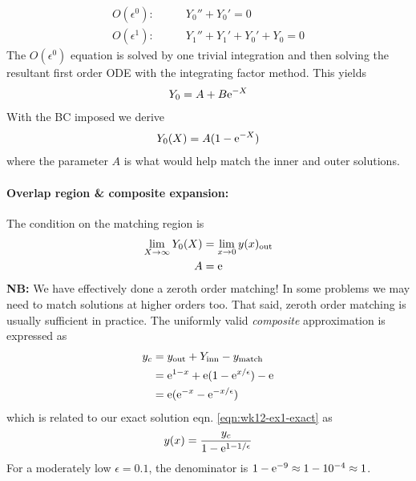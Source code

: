 \begin{align*}
	O(\epsilon^0): \qquad & Y_0'' + Y_0' = 0 \\
	O(\epsilon^1): \qquad & Y_1'' + Y_1' + Y_0' + Y_0 = 0
\end{align*}
The $O(\epsilon^0)$ equation is solved by one trivial integration and then solving the resultant first order ODE with the integrating factor method. This yields
\begin{gather*}
	Y_0 = A + B\mathrm{e}^{-X}
\end{gather*}
With the BC imposed we derive
\begin{gather*}
	Y_0(X) = A (1 - \mathrm{e}^{-X})
\end{gather*}
where the parameter $A$ is what would help match the inner and outer solutions.

\paragraph{Overlap region \& composite expansion:} The condition on the matching region is
\begin{align*}
	\lim\limits_{X \rightarrow \infty} Y_0(X) &= \lim\limits_{x\rightarrow 0} y(x)_\mathrm{out} \\
	A &= \mathrm{e}
\end{align*}
{\bf NB:} We have effectively done a zeroth order matching! In some problems we may need to match solutions at higher orders too. That said, zeroth order matching is usually sufficient in practice. The uniformly valid \emph{composite} approximation is expressed as
\begin{align*}
	y_c &= y_\mathrm{out} + Y_\mathrm{inn} - y_\mathrm{match} \\
	&= \mathrm{e}^{1-x} + \mathrm{e} (1-\mathrm{e}^{x/\epsilon}) - \mathrm{e} \\
	&= \mathrm{e} (\mathrm{e}^{-x} - \mathrm{e}^{-x/\epsilon})
\end{align*}
which is related to our exact solution eqn. \ref{eqn:wk12-ex1-exact} as
\begin{gather*}
	y(x) = \frac{y_c}{1 - \mathrm{e}^{1-1/\epsilon}}
\end{gather*}
For a moderately low $\epsilon=0.1$, the denominator is $1 - \mathrm{e}^{-9} \approx 1 - 10^{-4} \approx 1$. 
